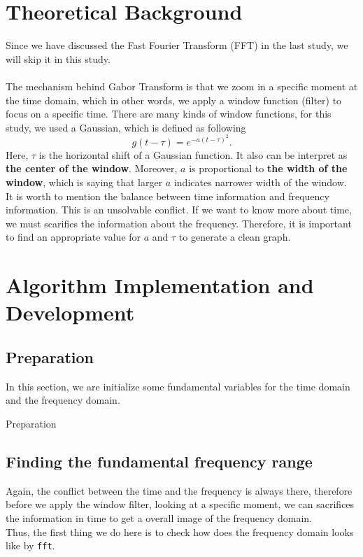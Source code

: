 \documentclass{article}
\begin{document}
\section{Theoretical Background}
Since we have discussed the Fast Fourier Transform (FFT) in the last study, we will skip it in this study. \\
~\\
The mechanism behind Gabor Transform is that we zoom in a specific moment at the time domain, which in other words, we apply a window function (filter) to focus on a specific time. There are many kinds of window functions, for this study, we used a Gaussian, which is defined as following
\begin{equation}
    g(t-\tau) = e^{-a(t-\tau)^2}.
\end{equation}
Here, $\tau$ is the horizontal shift of a Gaussian function. It also can be interpret as \textbf{the center of the window}. Moreover, $a$ is proportional to \textbf{the width of the window}, which is saying that larger $a$ indicates narrower width of the window.
~\\
It is worth to mention the balance between time information and frequency information. This is an unsolvable conflict. If we want to know more about time, we must scarifies the information about the frequency. Therefore, it is important to find an appropriate value for $a$ and $\tau$ to generate a clean graph.


\section{Algorithm Implementation and Development}
\subsection{Preparation}
In this section, we are initialize some fundamental variables for the time domain and the frequency domain.
\begin{algorithm}
\begin{algorithmic}
\end{algorithmic}
\caption{Preparation}
\end{algorithm}

\subsection{Finding the fundamental frequency range}
Again, the conflict between the time and the frequency is always there, therefore before we apply the window filter, looking at a specific moment, we can sacrifices the information in time to get a overall image of the frequency domain. \\
Thus, the first thing we do here is to check how does the frequency domain looks like by \texttt{fft}.
\end{document}
